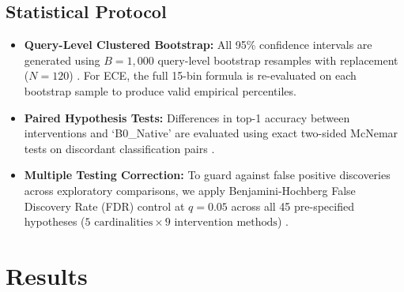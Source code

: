 \documentclass[10pt]{article}
\begin{document}
\subsection{Statistical Protocol}
\begin{itemize}
    \item \textbf{Query-Level Clustered Bootstrap:} All 95\% confidence intervals are generated using $B=1,000$ query-level bootstrap resamples with replacement ($N=120$) \citep{efron1993introduction}. For ECE, the full 15-bin formula is re-evaluated on each bootstrap sample to produce valid empirical percentiles.
    \item \textbf{Paired Hypothesis Tests:} Differences in top-1 accuracy between interventions and `B0\_Native' are evaluated using exact two-sided McNemar tests on discordant classification pairs \citep{mcnemar1947note}.
    \item \textbf{Multiple Testing Correction:} To guard against false positive discoveries across exploratory comparisons, we apply Benjamini-Hochberg False Discovery Rate (FDR) control at $q=0.05$ across all 45 pre-specified hypotheses ($5 \text{ cardinalities} \times 9 \text{ intervention methods}$) \citep{benjamini1995controlling}.
\end{itemize}

\section{Results}
\end{document}
